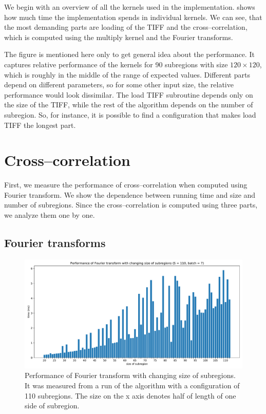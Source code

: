 We begin with an overview of all the kernels used in the implementation.  shows how much time the implementation spends in individual kernels. We can see, that the most demanding parts are loading of the TIFF and the cross--correlation, which is computed using the multiply kernel and the Fourier transforms.

The figure is mentioned here only to get general idea about the performance. It captures relative performance of the kernels for 90 subregions with size $120 \times 120$, which is roughly in the middle of the range of expected values. Different parts depend on different parameters, so for some other input size, the relative performance would look dissimilar. The load TIFF subroutine depends only on the size of the TIFF, while the rest of the algorithm depends on the number of subregion. So, for instance, it is possible to find a configuration that makes load TIFF the longest part. 

\section{Cross--correlation}
First, we measure the performance of cross--correlation when computed using Fourier transform. We show the dependence between running time and size and number of subregions. Since the cross--correlation is computed using three parts, we analyze them one by one.


\subsection{Fourier transforms}
\begin{figure}
	\centering
	\includegraphics[width=\textwidth]{img/eval/Fourier-transform-size}
	\caption{Performance of Fourier transform with changing size of subregions. It was measured from a run of the algorithm with a configuration of 110 subregions. The size on the x axis denotes half of length of one side of subregion.}
	\label{Fourier-transform-size}
\end{figure}

